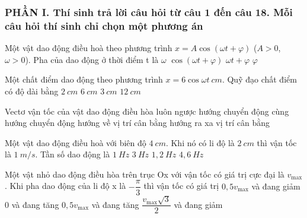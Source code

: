 \subsubsection*{PHẦN I. Thí sinh trả lời câu hỏi từ câu 1 đến câu 18. Mỗi câu hỏi thí sinh chỉ chọn một phương án}
\setcounter{ex}{0}
	\begin{ex} %
		Một vật dao động điều hoà theo phương trình $x = A\cos\left(\omega t + \varphi\right)$ ($A >0$, $\omega > 0$). Pha của dao động ở thời điểm t là
		\choice
		{$\omega$}
		{$\cos\left(\omega t + \varphi\right)$}
		{\True $\omega t + \varphi$}
		{$\varphi$}
	\end{ex}
	\begin{ex}%
		Một chất điểm dao động theo phương trình $x = 6\cos\omega t\ cm$. Quỹ đạo chất điểm có độ dài bằng
		\choice
		{$2\ cm$}
		{$6\ cm$}
		{$3\ cm$}
		{\True $12\ cm$}
	\end{ex}
	\begin{ex}%
		Vectơ vận tốc của vật dao động điều hòa luôn
		\choice
		{ngược hướng chuyển động}
		{\True cùng hướng chuyển động}
		{hướng về vị trí cân bằng}
		{hướng ra xa vị trí cân bằng}
	\end{ex}
	\begin{ex}%
		Một vật dao động điều hoà với biên độ $4\ cm$. Khi nó có li độ là $2\ cm$ thì vận tốc là $1\ m/s$. Tần số dao động là
		\choice 
		{$1\ Hz$}
		{$3\ Hz$}
		{$1,2\ Hz$}
		{\True $4,6\ Hz$}
	\end{ex}
	\begin{ex}%
		Một vật nhỏ dao động điều hòa trên trục Ox với vận tốc có giá trị cực đại là $v_{\max}$. Khi pha dao động của li độ x là  $-\dfrac{\pi}{3}$  thì vận tốc có giá trị
		\choice
		{$0,5v_{\max}$ và đang giảm}
		{$0$ và đang tăng}
		{$0,5v_{\max}$ và đang tăng}
		{\True $\dfrac{{{v}_{\max }}\sqrt{3}}{2}$ và đang giảm}
	\end{ex}
